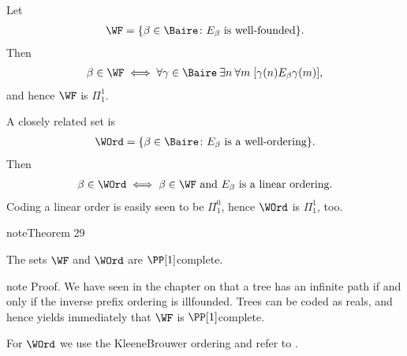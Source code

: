 \documentclass[letterpaper,10pt,english]{jupyterBook}
\begin{document}
\sphinxAtStartPar
Let
\begin{equation*}
\begin{split}
	\WF = \{\beta \in \Baire \colon \text{$E_\beta$ is well-founded} \}.
\end{split}
\end{equation*}
\sphinxAtStartPar
Then
\begin{equation*}
\begin{split}
	 \beta \in \WF \iff \forall \gamma \in \Baire \: \exists n \: \forall m \; [ \gamma(n) E_\beta \gamma(m) ],
\end{split}
\end{equation*}
\sphinxAtStartPar
and hence \(\WF\) is \(\Pi^1_1\).

\sphinxAtStartPar
A closely related set is
\begin{equation*}
\begin{split}
	\WOrd = \{\beta \in \Baire \colon \text{$E_\beta$ is a well-ordering} \}.
\end{split}
\end{equation*}
\sphinxAtStartPar
Then
\begin{equation*}
\begin{split}
	\beta \in \WOrd \iff \beta \in \WF  \text{ and $E_\beta$ is a linear ordering}.
\end{split}
\end{equation*}
\sphinxAtStartPar
Coding a linear order is easily seen to be \(\Pi^0_1\), hence \(\WOrd\) is \(\Pi^1_1\), too.
\label{coanalytic:thm-WF-Wadge-complete}
\begin{sphinxadmonition}{note}{Theorem 29}



\sphinxAtStartPar
The sets \(\WF\) and \(\WOrd\) are \(\PP[1]\)\sphinxhyphen{}complete.
\end{sphinxadmonition}

\begin{sphinxadmonition}{note}
\sphinxAtStartPar
Proof. We have seen in the chapter on {\hyperref[\detokenize{trees:chap-trees}]{}} that a tree has an infinite path  if and only if the inverse prefix ordering is ill\sphinxhyphen{}founded. Trees can be coded as reals, and hence {\hyperref[\detokenize{coanalytic:prop-norm-form-coanalytic}]{}} yields immediately that \(\WF\) is \(\PP[1]\)\sphinxhyphen{}complete.

\sphinxAtStartPar
For \(\WOrd\) we use the Kleene\sphinxhyphen{}Brouwer ordering and refer to {\hyperref[\detokenize{trees:prop-KB-wellorder}]{}}.
\end{sphinxadmonition}
\end{document}

